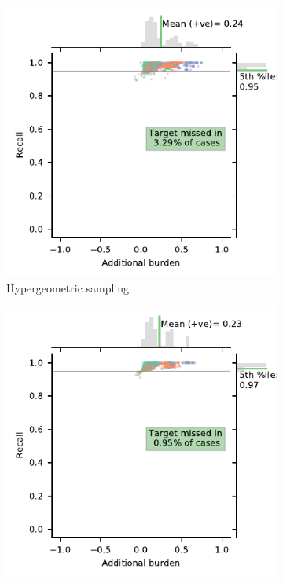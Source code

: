 \documentclass{bmcart}
\providecommand{\DIFaddbeginFL}{} %
\providecommand{\DIFaddendFL}{} %
\providecommand{\DIFdelbeginFL}{} %
\providecommand{\DIFdelendFL}{} %
\newcommand{\DIFscaledelfig}{0.5}
\newlength{\DIFdelgraphicswidth} %
\newlength{\DIFdelgraphicsheight} %
\newcommand{\DIFaddincludegraphics}[2][]{{\color{blue}\fbox{\DIFOincludegraphics[#1]{#2}}}} %
\newcommand{\DIFdelincludegraphics}[2][]{%
\sbox{\DIFdelgraphicsbox}{\DIFOincludegraphics[#1]{#2}}%
\settoboxwidth{\DIFdelgraphicswidth}{\DIFdelgraphicsbox} %
\settoboxtotalheight{\DIFdelgraphicsheight}{\DIFdelgraphicsbox} %
\scalebox{\DIFscaledelfig}{%
\parbox[b]{\DIFdelgraphicswidth}{\usebox{\DIFdelgraphicsbox}\\[-\baselineskip] \rule{\DIFdelgraphicswidth}{0em}}\llap{\resizebox{\DIFdelgraphicswidth}{\DIFdelgraphicsheight}{%
\setlength{\unitlength}{\DIFdelgraphicswidth}%
\begin{picture}(1,1)%
\thicklines\linethickness{2pt} %
{\color[rgb]{1,0,0}\put(0,0){\framebox(1,1){}}}%
{\color[rgb]{1,0,0}\put(0,0){\line( 1,1){1}}}%
{\color[rgb]{1,0,0}\put(0,1){\line(1,-1){1}}}%
\end{picture}%
}\hspace*{3pt}}} %
} %
\DeclareRobustCommand{\DIFaddbeginFL}{\DIFOaddbeginFL \let\includegraphics\DIFaddincludegraphics} %
\DeclareRobustCommand{\DIFaddendFL}{\DIFOaddendFL \let\includegraphics\DIFOincludegraphics} %
\DeclareRobustCommand{\DIFdelbeginFL}{\DIFOdelbeginFL \let\includegraphics\DIFdelincludegraphics} %
\DeclareRobustCommand{\DIFdelendFL}{\DIFOaddendFL \let\includegraphics\DIFOincludegraphics} %
\begin{document}
	\begin{figure}
		\centering
		\begin{subfigure}[b]{0.475\textwidth}   
			\centering 
			\DIFdelbeginFL %
\DIFdelendFL \DIFaddbeginFL \includegraphics[width=\textwidth]{2_figs_jointplot_burden_hyper.pdf}
			\DIFaddendFL \caption[]%
			{{\small Hypergeometric sampling \\}}    
			\label{fig:hyper_ab}
		\end{subfigure}
		\hfill
		\begin{subfigure}[b]{0.475\textwidth}   
			\centering 
			\DIFdelbeginFL %
\DIFdelendFL \DIFaddbeginFL \includegraphics[width=\textwidth]{2_figs_jointplot_burden_nrs.pdf}

\end{subfigure}
\end{figure}
\end{document}
